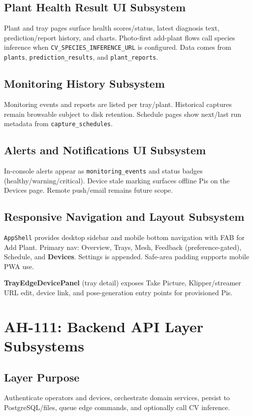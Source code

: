 \documentclass[11pt,letterpaper]{article}
\begin{document}
\subsection{Plant Health Result UI Subsystem}
Plant and tray pages surface health scores/status, latest diagnosis text, prediction/report
history, and charts. Photo-first add-plant flows call species inference when
\texttt{CV\_SPECIES\_INFERENCE\_URL} is configured. Data comes from \texttt{plants},
\texttt{prediction\_results}, and \texttt{plant\_reports}.

\subsection{Monitoring History Subsystem}
Monitoring events and reports are listed per tray/plant. Historical captures remain browsable
subject to disk retention. Schedule pages show next/last run metadata from
\texttt{capture\_schedules}.

\subsection{Alerts and Notifications UI Subsystem}
In-console alerts appear as \texttt{monitoring\_events} and status badges
(healthy/warning/critical). Device stale marking surfaces offline Pis on the Devices page.
Remote push/email remains future scope.

\subsection{Responsive Navigation and Layout Subsystem}
\texttt{AppShell} provides desktop sidebar and mobile bottom navigation with FAB for Add Plant.
Primary nav: Overview, Trays, Mesh, Feedback (preference-gated), Schedule, and \textbf{Devices}.
Settings is appended. Safe-area padding supports mobile PWA use.

\textbf{TrayEdgeDevicePanel} (tray detail) exposes Take Picture, Klipper/streamer URL edit, device
link, and pose-generation entry points for provisioned Pis.

\section{AH-111: Backend API Layer Subsystems}

\subsection{Layer Purpose}
Authenticate operators and devices, orchestrate domain services, persist to PostgreSQL/files,
queue edge commands, and optionally call CV inference.
\end{document}
